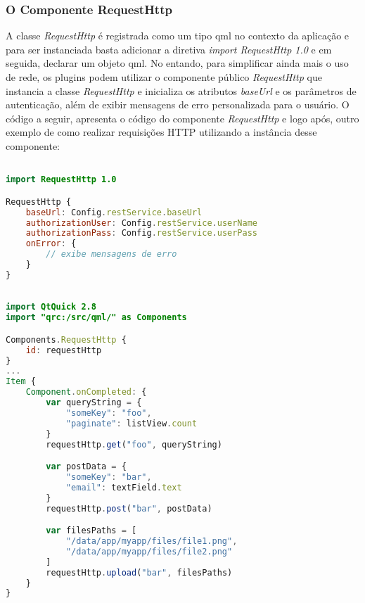 \subsubsection{O Componente RequestHttp}\label{sec:solucao-desenvolvida}
A classe \textit{RequestHttp} é registrada como um tipo qml no contexto da aplicação e para ser instanciada basta adicionar a diretiva \textit{import RequestHttp 1.0} e em seguida, declarar um objeto qml. No entando, para simplificar ainda mais o uso de rede, os plugins podem utilizar o componente público \textit{RequestHttp} que instancia a classe \textit{RequestHttp} e inicializa os atributos \textit{baseUrl} e os parâmetros de autenticação, além de exibir mensagens de erro personalizada para o usuário. O código a seguir, apresenta o código do componente \textit{RequestHttp} e logo após, outro exemplo de como realizar requisições HTTP utilizando a instância desse componente:

\begin{center}
\begin{lstlisting}[language=qml]

import RequestHttp 1.0 

RequestHttp {
    baseUrl: Config.restService.baseUrl
    authorizationUser: Config.restService.userName
    authorizationPass: Config.restService.userPass
    onError: {
		// exibe mensagens de erro
    }
}
\end{lstlisting}
\end{center}

\begin{center}
\begin{lstlisting}[language=qml]

import QtQuick 2.8
import "qrc:/src/qml/" as Components

Components.RequestHttp {
	id: requestHttp
}
...
Item {
	Component.onCompleted: {
		var queryString = {
			"someKey": "foo",
			"paginate": listView.count
		}
		requestHttp.get("foo", queryString)

		var postData = {
			"someKey": "bar",
			"email": textField.text
		}
		requestHttp.post("bar", postData)

		var filesPaths = [
			"/data/app/myapp/files/file1.png",
			"/data/app/myapp/files/file2.png"
		]
		requestHttp.upload("bar", filesPaths)
    }
}
\end{lstlisting}
\end{center}


